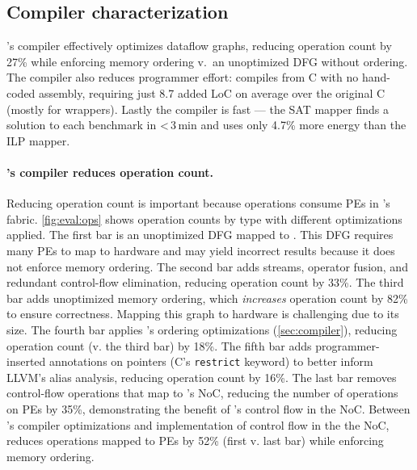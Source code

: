 \subsection{Compiler characterization}
\label{sec:eval:compiler}
\riptide's compiler effectively optimizes dataflow graphs, reducing operation
count by 27\% while enforcing memory ordering v.\ an unoptimized DFG without
ordering.
% 
The compiler also reduces programmer effort: \riptide compiles from C with
no hand-coded assembly, requiring just 8.7 added LoC on average over the original
C (mostly for wrappers).
% 
Lastly the compiler is fast --- the SAT mapper finds a solution to each benchmark in <\,3\,min and uses only 4.7\% more energy than the ILP mapper.

\paragraph{\riptide's compiler reduces operation count.} Reducing operation count
is important because operations consume PEs in \riptide's fabric.
%
\autoref{fig:eval:ops} shows operation counts by type with different optimizations applied.
% 
The first bar is an unoptimized DFG mapped to \riptide.
% 
This DFG requires many PEs to map to hardware and may yield incorrect
results because it does not enforce memory ordering.
% 
The second bar adds streams, operator fusion, and redundant control-flow
elimination, reducing operation count by 33\%.
% 
The third bar adds unoptimized memory ordering, which {\em increases} operation count by 82\% to ensure correctness.
% 
Mapping this graph to hardware is challenging due to its size.
% 
The fourth bar applies \riptide's ordering optimizations (\autoref{sec:compiler}), reducing operation count (v. the third bar) by 18\%.
% 
The fifth bar adds programmer-inserted annotations on pointers (C's {\tt restrict} keyword)
to better inform LLVM's alias analysis, reducing operation count by 16\%.
% 
% 
The last bar removes control-flow operations that map to \riptide's NoC, reducing
the number of operations on PEs by 35\%, demonstrating the benefit of
\riptide's control flow in the NoC.
% 
Between \riptide's compiler optimizations and implementation of control flow in the the NoC, \riptide reduces operations mapped to PEs by 52\% (first v. last bar) while enforcing memory ordering.
% 
\figRipTideLoCResults

